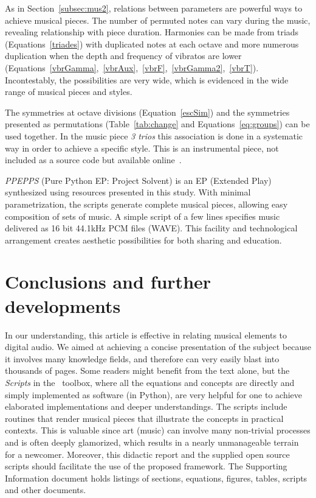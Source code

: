 As in Section~\ref{subsec:mus2}, relations between
parameters are powerful ways to achieve musical pieces.
The number of permuted
notes can vary during the music, revealing relationship with piece
duration. Harmonies can be made from triads (Equations~\ref{triades}) with duplicated
notes at each octave and more numerous duplication when the depth and frequency of
vibratos are lower (Equations~\ref{vbrGamma},~\ref{vbrAux},~\ref{vbrF},~\ref{vbrGamma2},~\ref{vbrT}).
Incontestably, the possibilities are very wide, which is evidenced in the wide range of musical pieces and styles.

The symmetries at octave divisions (Equation~\ref{escSim}) and the
symmetries presented as permutations (Table~\ref{tab:change} and
Equations~\ref{eq:groups}) can be used together. In the music piece \emph{3 trios}
this association is done in a systematic way in order to achieve a specific style. This is an instrumental piece, not included as a source
code but available online~\cite{3Trios}.

\emph{PPEPPS} (Pure Python EP: Project Solvent) is an EP (Extended Play) synthesized using
resources presented in this study. With minimal parametrization, the scripts
generate complete musical pieces, allowing easy composition of sets of
music. A simple script of a few lines specifies music delivered as 16 bit
44.1kHz PCM files (WAVE). This facility and technological
arrangement creates aesthetic possibilities for both sharing and education.

\section{Conclusions and further developments}
\label{cap:conclusao}
In our understanding,
this article is effective in relating musical elements to digital audio.
We aimed at achieving a concise presentation of the subject because it involves many knowledge fields, and therefore can very easily blast into thousands of pages.
Some readers might benefit from the text alone, but the \emph{Scripts} in the \massa\ toolbox, where all the equations and concepts are directly and simply implemented as software (in Python),
are very helpful for one to achieve elaborated implementations and deeper understandings.
The scripts include routines that render musical pieces that illustrate the concepts in practical contexts.
This is valuable since art (music) can involve many non-trivial processes and is often deeply glamorized, which results in a nearly unmanageable terrain for a newcomer.
Moreover, this didactic report and the supplied open source scripts should facilitate the use of the proposed framework.
The Supporting Information document holds listings of sections, equations, figures, tables, scripts and other documents.

